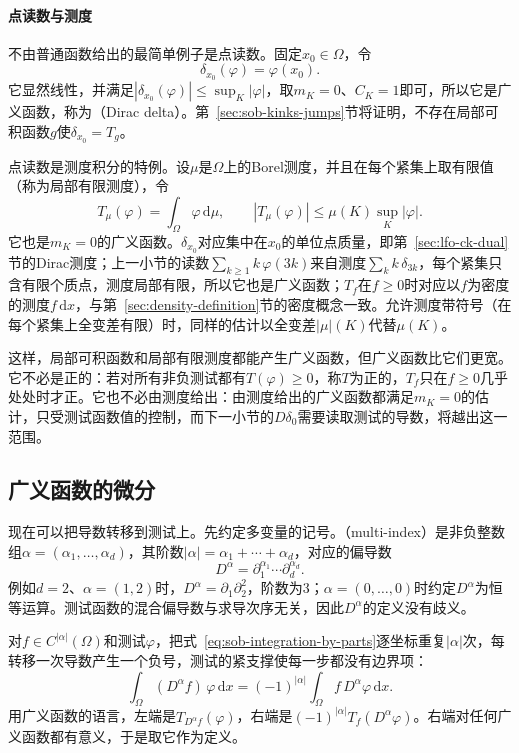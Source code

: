 \paragraph{点读数与测度}
不由普通函数给出的最简单例子是点读数。固定$x_0\in\Omega$，令
\[
 \delta_{x_0}(\varphi)=\varphi(x_0).
\]
它显然线性，并满足$|\delta_{x_0}(\varphi)|\le\sup_K|\varphi|$，取$m_K=0$、$C_K=1$即可，所以它是广义函数，称为（Dirac delta）。第~\ref{sec:sob-kinks-jumps}节将证明，不存在局部可积函数$g$使$\delta_{x_0}=T_g$。

点读数是测度积分的特例。设$\mu$是$\Omega$上的Borel测度，并且在每个紧集上取有限值（称为局部有限测度），令
\[
 T_\mu(\varphi)=\int_\Omega\varphi\,\mathrm d\mu ,\qquad |T_\mu(\varphi)|\le\mu(K)\sup_K|\varphi| .
\]
它也是$m_K=0$的广义函数。$\delta_{x_0}$对应集中在$x_0$的单位点质量，即第~\ref{sec:lfo-ck-dual}节的Dirac测度；上一小节的读数$\sum_{k\ge1}k\,\varphi(3k)$来自测度$\sum_kk\,\delta_{3k}$，每个紧集只含有限个质点，测度局部有限，所以它也是广义函数；$T_f$在$f\ge0$时对应以$f$为密度的测度$f\,\mathrm dx$，与第~\ref{sec:density-definition}节的密度概念一致。允许测度带符号（在每个紧集上全变差有限）时，同样的估计以全变差$|\mu|(K)$代替$\mu(K)$。

这样，局部可积函数和局部有限测度都能产生广义函数，但广义函数比它们更宽。它不必是正的：若对所有非负测试都有$T(\varphi)\ge0$，称$T$为正的，$T_f$只在$f\ge0$几乎处处时才正。它也不必由测度给出：由测度给出的广义函数都满足$m_K=0$的估计，只受测试函数值的控制，而下一小节的$D\delta_0$需要读取测试的导数，将越出这一范围。

\subsection{广义函数的微分}
\label{sec:sob-distribution-derivative}

现在可以把导数转移到测试上。先约定多变量的记号。（multi-index）是非负整数组$\alpha=(\alpha_1,\ldots,\alpha_d)$，其阶数$|\alpha|=\alpha_1+\cdots+\alpha_d$，对应的偏导数
\[
 D^\alpha=\partial_1^{\alpha_1}\cdots\partial_d^{\alpha_d}.
\]
例如$d=2$、$\alpha=(1,2)$时，$D^\alpha=\partial_1\partial_2^2$，阶数为$3$；$\alpha=(0,\ldots,0)$时约定$D^\alpha$为恒等运算。测试函数的混合偏导数与求导次序无关，因此$D^\alpha$的定义没有歧义。

对$f\in C^{|\alpha|}(\Omega)$和测试$\varphi$，把式~\eqref{eq:sob-integration-by-parts}逐坐标重复$|\alpha|$次，每转移一次导数产生一个负号，测试的紧支撑使每一步都没有边界项：
\begin{equation}
 \int_\Omega(D^\alpha f)\,\varphi\,\mathrm dx=(-1)^{|\alpha|}\int_\Omega f\,D^\alpha\varphi\,\mathrm dx .
 \label{eq:sob-repeated-parts}
\end{equation}
用广义函数的语言，左端是$T_{D^\alpha f}(\varphi)$，右端是$(-1)^{|\alpha|}T_f(D^\alpha\varphi)$。右端对任何广义函数都有意义，于是取它作为定义。

